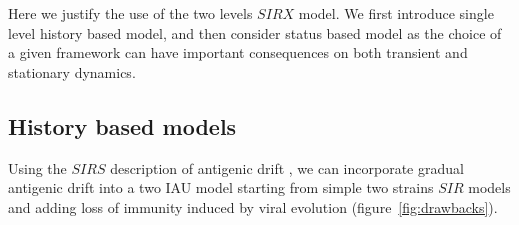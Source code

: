 Here we justify the use of the two levels $SIRX$ model.  We first
introduce single level history based model, and then consider status
based model as the choice of a given framework can have important
consequences on both transient \citep{Ballesteros2009} and stationary
\citep{Dawes2002} dynamics.

\subsection{History based models}

Using the $SIRS$ description of antigenic drift \citep{Pease1987}, we
can incorporate gradual antigenic drift into a two IAU model starting
from simple two strains $SIR$ models and adding loss of immunity
induced by viral evolution (figure~\ref{fig:drawbacks}).

